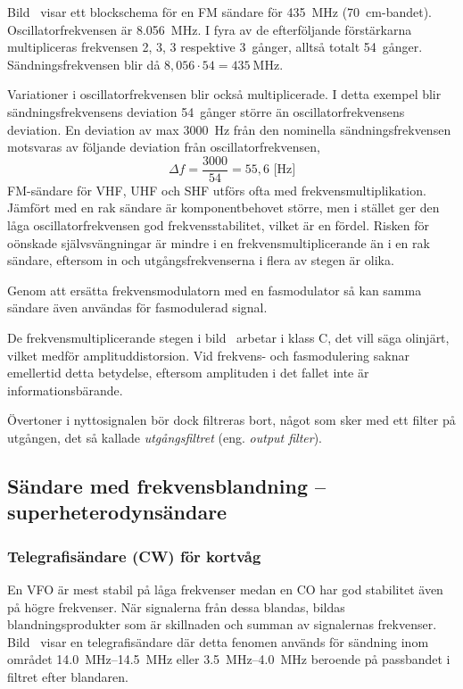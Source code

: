 Bild~ visar ett blockschema för en FM sändare för
\qty{435}{\mega\hertz} (\qty{70}{\centi\metre}-bandet).
Oscillatorfrekvensen är \qty{8,056}{\mega\hertz}.
I fyra av de efterföljande förstärkarna multipliceras frekvensen 2, 3, 3
respektive 3~gånger, alltså totalt 54~gånger.
Sändningsfrekvensen blir då \(8,056 \cdot 54 = \qty{435}{\mega\hertz}\).

Variationer i oscillatorfrekvensen blir också multiplicerade.
I detta exempel blir sändningsfrekvensens deviation 54~gånger större än
oscillatorfrekvensens deviation.
En deviation av max \qty{3000}{\hertz} från den nominella sändningsfrekvensen
motsvaras av följande deviation från oscillatorfrekvensen,
\[\Delta f = \frac{3000}{54} = 55,6\text{ [Hz]}\]
FM-sändare för VHF, UHF och SHF utförs ofta med
frekvensmultiplikation.
Jämfört med en rak sändare är komponentbehovet större, men i stället ger
den låga oscillatorfrekvensen god frekvensstabilitet, vilket är en fördel.
Risken för oönskade självsvängningar är mindre i en frekvensmultiplicerande
än i en rak sändare, eftersom in och utgångsfrekvenserna i flera av stegen är
olika.

Genom att ersätta frekvensmodulatorn med en fasmodulator så kan samma
sändare även användas för fasmodulerad signal.

De frekvensmultiplicerande stegen i bild~ arbetar i klass C,
det vill säga olinjärt, vilket medför amplituddistorsion.
Vid frekvens- och fasmodulering saknar emellertid detta betydelse, eftersom
amplituden i det fallet inte är informationsbärande.

Övertoner i nyttosignalen bör dock filtreras bort, något som sker med ett
filter på utgången, det så kallade \emph{utgångsfiltret}
(eng. \emph{output filter}).

\subsection{Sändare med frekvensblandning -- superheterodynsändare}
\label{sändare_frekvensblandning}

\subsubsection{Telegrafisändare (CW) för kortvåg}

En VFO är mest stabil på låga frekvenser medan en CO har god
stabilitet även på högre frekvenser.
När signalerna från dessa blandas, bildas blandningsprodukter som är
skillnaden och summan av signalernas frekvenser.
Bild~ visar en telegrafisändare där detta fenomen används
för sändning inom området \SIrange{14,0}{14,5}{\mega\hertz} eller
\SIrange{3,5}{4,0}{\mega\hertz} beroende på passbandet i filtret efter
blandaren.

